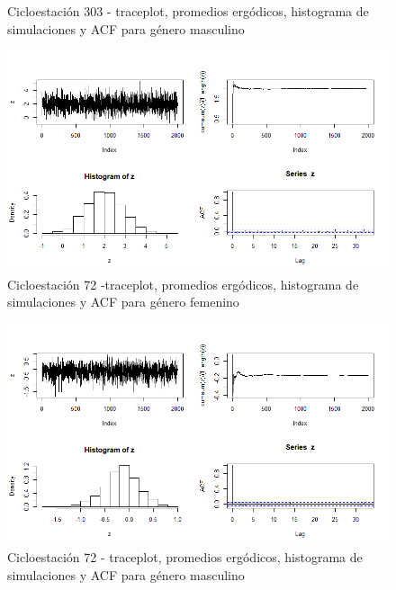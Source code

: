 \documentclass[9pt,twocolumn,twoside]{ilcss}
\begin{document}
\begin{appendices}
\begin{figure}[tbhp]
	\caption{ Cicloestación 303 - traceplot, promedios ergódicos, histograma de simulaciones y ACF para género masculino}
	\label{fig:303_traceplot_masculino}
\end{figure}
\begin{figure}[tbhp]
	\centering
	\includegraphics[width=0.9\linewidth]{Paper/images/72_genero_1mujer.png}
	\caption{ Cicloestación 72 -traceplot, promedios ergódicos, histograma de simulaciones y ACF para género femenino}
	\label{fig:72_traceplot_femenino}
\end{figure}
\begin{figure}[tbhp]
	\centering
	\includegraphics[width=0.9\linewidth]{Paper/images/72_genero_2hombre.png}
	\caption{ Cicloestación 72 - traceplot, promedios ergódicos, histograma de simulaciones y ACF para género masculino}
	\label{fig:72_traceplot_masculino}
\end{figure}


\end{appendices}
\end{document}
